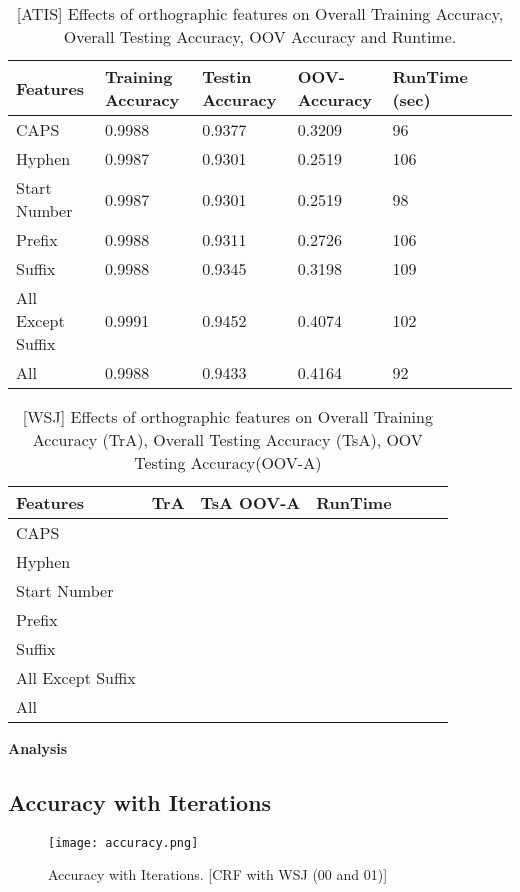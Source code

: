 \begin{center}	
	\begin{table}[ht]
  	\centering
   	\begin{tabular}{| l | l | l | l | l | l | l |}
    	\hline
        Features & Training Accuracy & Testin Accuracy & OOV-Accuracy & RunTime (sec) \\ \hline
	CAPS & 0.9988	 & 0.9377 & 0.3209 &  96 \\ \hline
	Hyphen & 0.9987 & 0.9301 & 0.2519 & 106 \\ \hline
	Start Number & 0.9987 & 0.9301 & 0.2519 & 98 \\ \hline
	Prefix & 0.9988 & 0.9311 & 0.2726 & 106 \\ \hline
	Suffix & 0.9988 & 0.9345 & 0.3198 & 109 \\ \hline
	All Except Suffix & 0.9991 & 0.9452 & 0.4074 & 102 \\ \hline
	All & 0.9988 & 0.9433 & 0.4164 & 92 \\ \hline
    	\end{tabular}
    	\caption{[ATIS] Effects of orthographic features on Overall Training Accuracy, Overall Testing Accuracy, OOV Accuracy and Runtime.}
    	\end{table}%
\end{center}

\begin{center}	
	\begin{table}[ht]
  	\centering
   	\begin{tabular}{| l | l | l | l | l | l | l |}
    	\hline
        Features & TrA & TsA OOV-A & RunTime \\ \hline
	CAPS & & & & & \\ \hline
	Hyphen & & & & & \\ \hline
	Start Number & & & & & \\ \hline
	Prefix & & & & & \\ \hline
	Suffix & & & & & \\ \hline
	All Except Suffix & & & & & \\ \hline
	All & & & & & \\ \hline
    	\end{tabular}
    	\caption{[WSJ] Effects of orthographic features on Overall Training Accuracy (TrA), Overall Testing Accuracy (TsA), OOV Testing Accuracy(OOV-A)}
    	\end{table}%
\end{center}

{\bfseries Analysis}

\subsection {Accuracy with Iterations}

\begin{figure}[ht!]
\centering
\texttt{[image: accuracy.png]}
\caption{Accuracy with Iterations. [CRF with WSJ (00 and 01)]}
\label{accuracy}
\end{figure}




